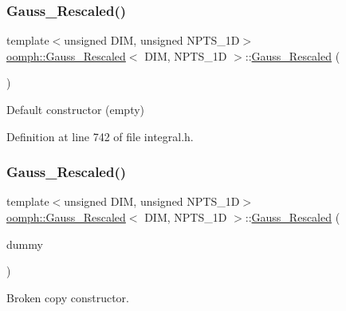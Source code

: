 \subsubsection{\texorpdfstring{Gauss\+\_\+\+Rescaled()}{Gauss\_Rescaled()}\hspace{0.1cm}{\footnotesize\ttfamily [1/3]}}
{\footnotesize\ttfamily template$<$unsigned D\+IM, unsigned N\+P\+T\+S\+\_\+1D$>$ \\
\hyperlink{classoomph_1_1Gauss__Rescaled}{oomph\+::\+Gauss\+\_\+\+Rescaled}$<$ D\+IM, N\+P\+T\+S\+\_\+1D $>$\+::\hyperlink{classoomph_1_1Gauss__Rescaled}{Gauss\+\_\+\+Rescaled} (\begin{DoxyParamCaption}{ }\end{DoxyParamCaption})\hspace{0.3cm}{\ttfamily [inline]}}



Default constructor (empty) 



Definition at line 742 of file integral.\+h.

\mbox{\label{classoomph_1_1Gauss__Rescaled_a8f83104458ac63bf3d1e8f668361ac64}} 
\subsubsection{\texorpdfstring{Gauss\+\_\+\+Rescaled()}{Gauss\_Rescaled()}\hspace{0.1cm}{\footnotesize\ttfamily [2/3]}}
{\footnotesize\ttfamily template$<$unsigned D\+IM, unsigned N\+P\+T\+S\+\_\+1D$>$ \\
\hyperlink{classoomph_1_1Gauss__Rescaled}{oomph\+::\+Gauss\+\_\+\+Rescaled}$<$ D\+IM, N\+P\+T\+S\+\_\+1D $>$\+::\hyperlink{classoomph_1_1Gauss__Rescaled}{Gauss\+\_\+\+Rescaled} (\begin{DoxyParamCaption}\item[{const \hyperlink{classoomph_1_1Gauss__Rescaled}{Gauss\+\_\+\+Rescaled}$<$ D\+IM, N\+P\+T\+S\+\_\+1D $>$ \&}]{dummy }\end{DoxyParamCaption})\hspace{0.3cm}{\ttfamily [inline]}}



Broken copy constructor. 



